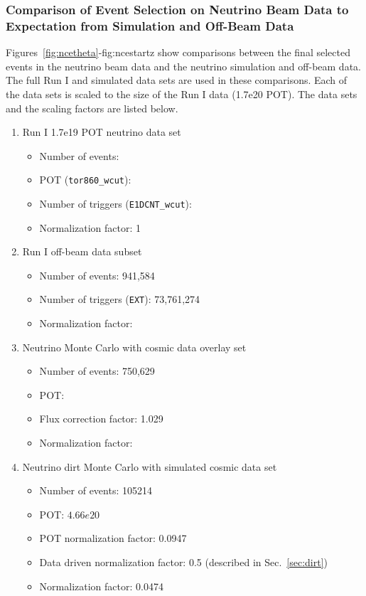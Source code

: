   \subsubsection{Comparison of Event Selection on Neutrino Beam Data to
  Expectation from Simulation and Off-Beam Data}
    Figures~\ref{fig:ncetheta}-{fig:ncestartz} show comparisons between the
    final selected events in the neutrino beam data and the neutrino simulation
    and off-beam data. The full Run I and simulated data sets are used in these
    comparisons. Each of the data sets is scaled to the size of the Run I data
    (1.7e20 POT). The data sets and the scaling factors are listed below.
    \begin{enumerate}
      \item Run I 1.7e19 POT neutrino data set
      \begin{itemize}
        \item Number of events: 
        \item POT (\texttt{tor860\_wcut}): 
        \item Number of triggers (\texttt{E1DCNT\_wcut}):
        \item Normalization factor: 1
      \end{itemize}
      \item Run I off-beam data subset
      \begin{itemize}
        \item Number of events: 941,584
        \item Number of triggers (\texttt{EXT}): 73,761,274
        \item Normalization factor: 
      \end{itemize}
      \item Neutrino Monte Carlo with cosmic data overlay set
      \begin{itemize}
        \item Number of events: 750,629
        \item POT: 
        \item Flux correction factor: 1.029
        \item Normalization factor: 
      \end{itemize}
    \item Neutrino dirt Monte Carlo with simulated cosmic data set
      \begin{itemize}
        \item Number of events: 105214
        \item POT: $4.66e20$
        \item POT normalization factor: 0.0947
        \item Data driven normalization factor: 0.5 (described in Sec.~\ref{sec:dirt})
        \item Normalization factor: 0.0474
      \end{itemize}
    \end{enumerate}

